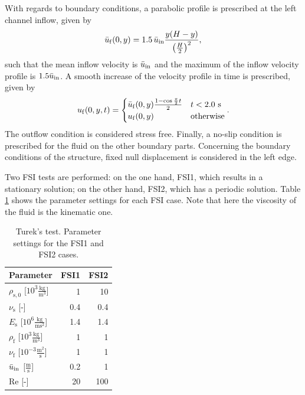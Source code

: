 \documentclass[11pt,english]{article}
\providecommand{\tabularnewline}{\\}
\begin{document}
With regards to boundary conditions, a parabolic profile is prescribed at the left channel inflow, given by
\begin{equation}
    \bar{u}_{\rm{f}} (0,y) = 1.5 \, \bar{u}_{\rm in} \frac{y ( H - y )}{\left ( \frac{H}{2} \right )^2},
\end{equation}
such that the mean inflow velocity is $ \bar{u}_{\rm in}$ and the maximum of the inflow velocity profile is $1.5 \bar{u}_{\rm in}$.  A smooth increase of the velocity profile in time is prescribed, given by
\begin{equation}
    {u}_{\rm{f}} (0,y,t)=\begin{cases}
    \bar{u}_{\rm{f}} (0,y)\frac{1-\cos{\frac{\pi}{2}t}}{2} & t < 2.0\text{ s}\\
    {u}_{\rm{f}} (0,y) & \text{otherwise}
    \end{cases}. \label{eq:initial_condition_parabolic_profile}
\end{equation}
The outflow condition is considered stress free. Finally, a no-slip condition is prescribed for the fluid on the other boundary parts. 
Concerning the boundary conditions of the structure, fixed null displacement is considered in the left edge.

Two FSI tests are performed: on the one hand, FSI1, which results in a stationary solution; on the other hand, FSI2, which has a periodic solution. Table \ref{fig:turek_parameter_settings} shows the parameter settings for each FSI case. Note that here the viscosity of the fluid is the kinematic one.

\begin{table}[h]
    \begin{center}
        \begin{tabular}{lrr}
            \toprule
            \textbf{Parameter}                                           & \textbf{FSI1} & \textbf{FSI2}  \tabularnewline
            \toprule
            $\rho_\mathrm{s,0}$ {[}$10^3 \frac{\text{kg}}{\text{m}^3}${]}  & 1 & 10            \tabularnewline
            $\nu_{\mathrm{s}}$ {[-}{]}                                   & 0.4 & 0.4         \tabularnewline
            $E_\mathrm{s}$ {[}$10^6 \frac{\text{kg}}{\text{ms}^2}${]}    & 1.4 & 1.4         \tabularnewline 
            \toprule
            $\rho_\mathrm{f}$ {[}$10^3 \frac{\text{kg}}{\text{m}^3}${]}  & 1 & 1             \tabularnewline
            $\nu_{\mathrm{f}}$ {[}$10^{-3}\frac{\text{m}^2}{\text{s}}${]}& 1 & 1             \tabularnewline
            $ \bar{u}_{\rm in}$ {[}$\frac{\text{m}}{\text{s}}${]}            & 0.2 & 1           \tabularnewline
            Re [-]                                                          & 20 & 100          \tabularnewline
            \bottomrule
        \end{tabular}
        \caption{Turek's test. Parameter settings for the FSI1 and FSI2 cases.}
        \label{fig:turek_parameter_settings}
    \end{center}
\end{table}
\end{document}
